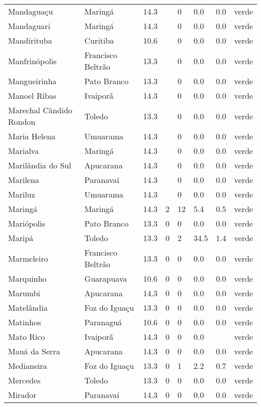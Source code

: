 \begin{longtable}{l|lllllll}
  Mandaguaçu & Maringá & 14.3 &  & 0 & 0.0 & 0.0 & verde \\ 
  Mandaguari & Maringá & 14.3 &  & 0 & 0.0 & 0.0 & verde \\ 
  Mandirituba & Curitiba & 10.6 &  & 0 & 0.0 & 0.0 & verde \\ 
  Manfrinópolis & Francisco Beltrão & 13.3 &  & 0 & 0.0 & 0.0 & verde \\ 
  Mangueirinha & Pato Branco & 13.3 &  & 0 & 0.0 & 0.0 & verde \\ 
  Manoel Ribas & Ivaiporã & 14.3 &  & 0 & 0.0 & 0.0 & verde \\ 
  Marechal Cândido Rondon & Toledo & 13.3 &  & 0 & 0.0 & 0.0 & verde \\ 
  Maria Helena & Umuarama & 14.3 &  & 0 & 0.0 & 0.0 & verde \\ 
  Marialva & Maringá & 14.3 &  & 0 & 0.0 & 0.0 & verde \\ 
  Marilândia do Sul & Apucarana & 14.3 &  & 0 & 0.0 & 0.0 & verde \\ 
  Marilena & Paranavaí & 14.3 &  & 0 & 0.0 & 0.0 & verde \\ 
  Mariluz & Umuarama & 14.3 &  & 0 & 0.0 & 0.0 & verde \\ 
  Maringá & Maringá & 14.3 & 2 & 12 & 5.4 & 0.5 & verde \\ 
  Mariópolis & Pato Branco & 13.3 & 0 & 0 & 0.0 & 0.0 & verde \\ 
  Maripá & Toledo & 13.3 & 0 & 2 & 34.5 & 1.4 & verde \\ 
  Marmeleiro & Francisco Beltrão & 13.3 & 0 & 0 & 0.0 & 0.0 & verde \\ 
  Marquinho & Guarapuava & 10.6 & 0 & 0 & 0.0 & 0.0 & verde \\ 
  Marumbi & Apucarana & 14.3 & 0 & 0 & 0.0 & 0.0 & verde \\ 
  Matelândia & Foz do Iguaçu & 13.3 & 0 & 0 & 0.0 & 0.0 & verde \\ 
  Matinhos & Paranaguá & 10.6 & 0 & 0 & 0.0 & 0.0 & verde \\ 
  Mato Rico & Ivaiporã & 14.3 & 0 & 0 & 0.0 &  & verde \\ 
  Mauá da Serra & Apucarana & 14.3 & 0 & 0 & 0.0 & 0.0 & verde \\ 
  Medianeira & Foz do Iguaçu & 13.3 & 0 & 1 & 2.2 & 0.7 & verde \\ 
  Mercedes & Toledo & 13.3 & 0 & 0 & 0.0 & 0.0 & verde \\ 
  Mirador & Paranavaí & 14.3 & 0 & 0 & 0.0 & 0.0 & verde \\ 

\end{longtable}
